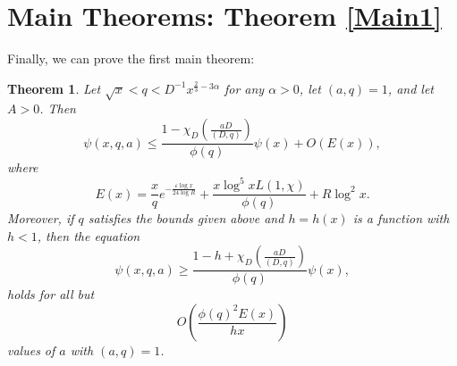 \documentclass{amsart}
\newtheorem{theorem}{Theorem}[section]
\begin{document}
\section{Main Theorems: Theorem \ref{Main1}}
Finally, we can prove the first main theorem:
\begin{theorem}
Let $\sqrt x<q<D^{-1}x^{\frac 23-3\alpha}$ for any $\alpha>0$, let $(a,q)=1$, and let $A>0$.
Then
$$\psi(x,q,a)\leq \frac{1-\chi_D\left(\frac{aD}{(D,q)}\right)}{\phi(q)}\psi(x)+O(E(x)),$$
where
$$E(x)=\frac xqe^{-\frac{\varepsilon\log x}{24\log R}
}+\frac{x\log^5 xL(1,\chi)}{\phi(q)}+R\log^2 x.$$
Moreover, if $q$ satisfies the bounds given above and $h=h(x)$ is a function with $h<1$, then the equation
$$\psi(x,q,a)\geq \frac{1-h+\chi_D\left(\frac{aD}{(D,q)}\right)}{\phi(q)}\psi(x),$$
holds for all but $$O\left(\frac{\phi(q)^2E(x)}{hx}\right)$$values of $a$ with $(a,q)=1$.
\end{theorem}
\end{document}
